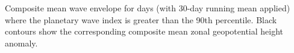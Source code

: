 \label{fig:envelope_climatology}
Composite mean wave envelope for days (with 30-day running mean applied) where the planetary wave index is greater than the 90th percentile. Black contours show the corresponding composite mean zonal geopotential height anomaly.  
